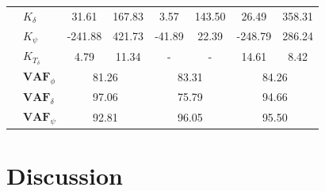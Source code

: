 \begin{table}[]
\begin{tabular}{llcccccc}
                                    & $K_\delta $           & 31.61                                      & 167.83                                             & 3.57                                       & 143.50                                             & 26.49                                      & 358.31                                             \\
                                    & $K_\psi $             & -241.88                                    & 421.73                                             & -41.89                                     & 22.39                                              & -248.79                                    & 286.24                                             \\
                                    & $K_{T_\delta}$        & 4.79                                       & 11.34                                              & -                                          & -                                                  & 14.61                                      & 8.42                                               \\ \cline{2-8} 
                                    & $\mathbf{VAF}_\phi$   & \multicolumn{2}{c}{81.26}                                                                       & \multicolumn{2}{c}{83.31}                                                                       & \multicolumn{2}{c}{84.26}                                                                       \\
                                    & $\mathbf{VAF}_\delta$ & \multicolumn{2}{c}{97.06}                                                                       & \multicolumn{2}{c}{75.79}                                                                       & \multicolumn{2}{c}{94.66}                                                                       \\
                                    & $\mathbf{VAF}_\psi$   & \multicolumn{2}{c}{92.81}                                                                       & \multicolumn{2}{c}{96.05}                                                                       & \multicolumn{2}{c}{95.50}                                                                      
    \end{tabular}
    \label{tb:predict_model}
    \end{table}

\section{Discussion}
 
